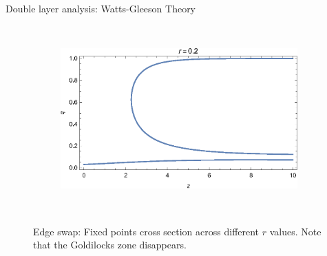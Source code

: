 \documentclass[10pt, xcolor=dvipsnames, handout]{beamer}
\begin{document}
\begin{frame}{Double layer analysis: Watts-Gleeson Theory}
\begin{figure}
\begin{subfigure}[b]{0.4\textwidth}
    \end{subfigure}
    ~ %
    \begin{subfigure}[b]{0.4\textwidth}
        \includegraphics[width=\textwidth]{figures/two_layer_edge_qz_r02}
    \end{subfigure}
    ~
    \caption{Edge swap: Fixed points cross section across different $r$ values. Note that the Goldilocks zone disappears. }
\end{figure}
\end{frame}
\end{document}
